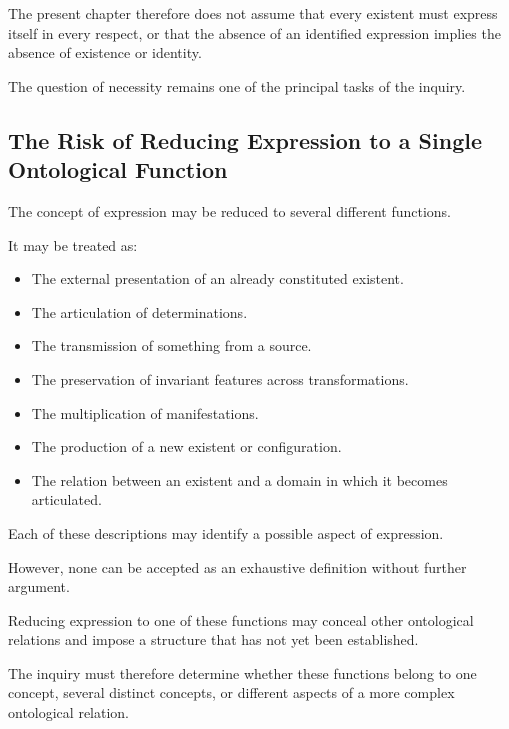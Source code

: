 The present chapter therefore does
not assume that every existent must
express itself in every respect,
or that the absence of an identified
expression implies the absence of
existence or identity.

The question of necessity remains
one of the principal tasks of the inquiry.

\subsection{The Risk of Reducing Expression to a Single Ontological Function}

The concept of expression may be reduced
to several different functions.

It may be treated as:

\begin{itemize}

    \item The external presentation of
    an already constituted existent.

    \item The articulation of determinations.

    \item The transmission of something
    from a source.

    \item The preservation of invariant
    features across transformations.

    \item The multiplication of manifestations.

    \item The production of a new existent
    or configuration.

    \item The relation between an existent
    and a domain in which it becomes
    articulated.

\end{itemize}

Each of these descriptions may identify
a possible aspect of expression.

However, none can be accepted as
an exhaustive definition without
further argument.

Reducing expression to one of these
functions may conceal other ontological
relations and impose a structure that
has not yet been established.

The inquiry must therefore determine
whether these functions belong to
one concept, several distinct concepts,
or different aspects of a more complex
ontological relation.

